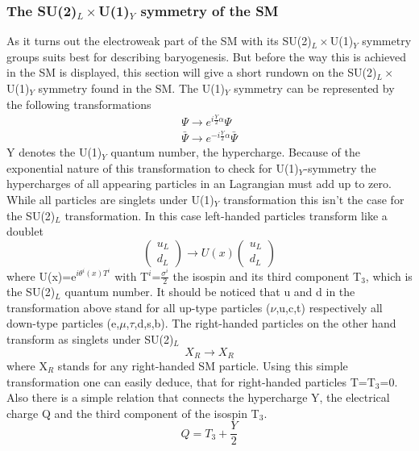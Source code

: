 \subsubsection{The SU(2)$_L\times$U(1)$_Y$ symmetry of the SM}
As it turns out the electroweak part of the SM with its SU(2)$_L\times$U(1)$_Y$ symmetry groups suits best for describing baryogenesis. But before the way this is achieved in the SM is displayed, this section will give a short rundown on the SU(2)$_L\times$U(1)$_Y$ symmetry found in the SM.\newline
The U(1)$_Y$ symmetry can be represented by the following transformations
\begin{align*}
\Psi \longrightarrow e^{i\frac{Y}{2}\alpha}\Psi\\
\bar{\Psi} \longrightarrow e^{-i\frac{Y}{2}\alpha}\bar{\Psi}
\end{align*}
Y denotes the U(1)$_Y$ quantum number, the hypercharge. Because of the exponential nature of this transformation to check for U(1)$_Y$-symmetry the hypercharges of all appearing particles in an Lagrangian must add up to zero. \newline
While all particles are singlets under U(1)$_Y$ transformation this isn't the case for the SU(2)$_L$ transformation. In this case left-handed particles transform like a doublet
\begin{equation*}
	\left(\begin{array}{c}u_L\\d_L\end{array}\right)\longrightarrow U(x)	\left(\begin{array}{c}u_L\\d_L\end{array}\right)
\end{equation*}
where U(x)=e$^{i\theta^i(x)T^i}$ with T$^i$=$\frac{\sigma^i}{2}$ the isospin and its third component T$_3$, which is the SU(2)$_L$ quantum number. It should be noticed that u and d in the transformation above stand for all up-type particles ($\nu$,u,c,t) respectively all down-type particles (e,$\mu$,$\tau$,d,s,b). The right-handed particles on the other hand transform as singlets under SU(2)$_L$
\begin{equation*}
	X_R\longrightarrow X_R
\end{equation*}
where X$_R$ stands for any right-handed SM particle. Using this simple transformation one can easily deduce, that for right-handed particles T=T$_3$=0.\newline
Also there is a simple relation that connects the hypercharge Y, the electrical charge Q and the third component of the isospin T$_3$.
\begin{equation}
Q=T_3+\frac{Y}{2}
\label{eq:ladung_hyperladung_isospin}
\end{equation}
